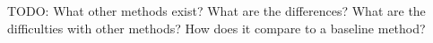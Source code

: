 TODO: What other methods exist? What are the differences? What are the difficulties with other methods? How does it compare to a baseline method?